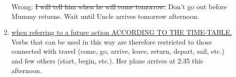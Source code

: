 \begin{enumerate}
\begin{enumerate}
                \newline
                Wrong: \st{I will tell him when he will come tomorrow.}
                \newline
                Don't go out before Mummy returns.
                \newline
                Wait until Uncle arrives tomorrow afternoon.
            \item \underline{when referring to a future action ACCORDING TO THE 
                TIME-TABLE.}
                \newline
                Verbs that can be used in this way are therefore restricted to
                those connected with travel (come, go, arrive, leave, return,
                depart, sail, etc.) and few others (start, begin, etc.).
                \newline
                Her plane arrives at 2:35 this afternoon.
        \end{enumerate}
\end{enumerate}
